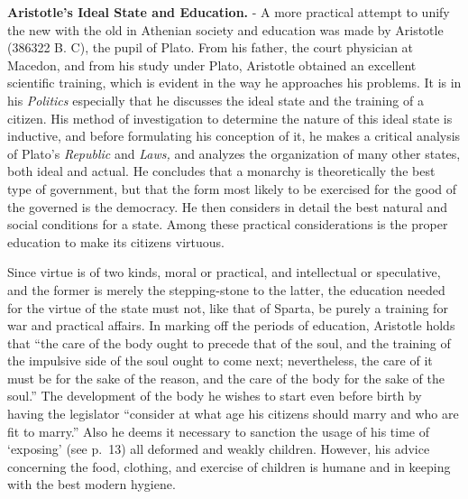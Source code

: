\documentclass[]{book}
\begin{document}
\textbf{Aristotle's Ideal State and Education.} - A more practical attempt to unify the new with the old in Athenian society and education was made by Aristotle (386322 B. C), the pupil of Plato. From his father, the court physician at Macedon, and from his study under Plato, Aristotle obtained an excellent scientific training, which is evident in the way he approaches his problems. It is in his \emph{Politics} especially that he discusses the ideal state and the training of a citizen. His method of investigation to determine the nature of this ideal state is inductive, and before formulating his conception of it, he makes a critical analysis of Plato's \emph{Republic} and \emph{Laws,} and analyzes the organization of many other states, both ideal and actual. He concludes that a monarchy is theoretically the best type of government, but that the form most likely to be exercised for the good of the governed is the democracy. He then considers in detail the best natural and social conditions for a state. Among these practical considerations is the proper education to make its citizens virtuous.

Since virtue is of two kinds, moral or practical, and intellectual or speculative, and the former is merely the stepping-stone to the latter, the education needed for the virtue of the state must not, like that of Sparta, be purely a training for war and practical affairs. In marking off the periods of education, Aristotle holds that ``the care of the body ought to precede that of the soul, and the training of the impulsive side of the soul ought to come next; nevertheless, the care of it must be for the sake of the reason, and the care of the body for the sake of the soul.'' The development of the body he wishes to start even before birth by having the legislator ``consider at what age his citizens should marry and who are fit to marry.'' Also he deems it necessary to sanction the usage of his time of `exposing' (see p.~13) all deformed and weakly children. However, his advice concerning the food, clothing, and exercise of children is humane and in keeping with the best modern hygiene.
\end{document}
